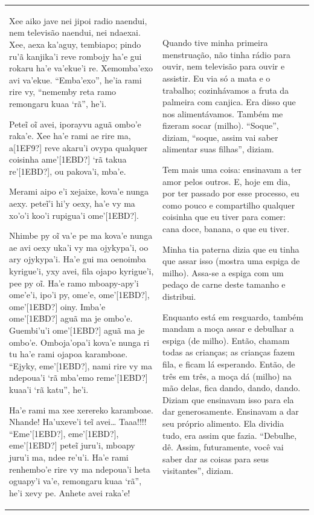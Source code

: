 \begin{flushleft}
\tablehead{}
\begin{supertabular}{m{2.8781598in}|m{2.8781598in}}
Xee aiko jave nei jipoi radio naendui, nem televisão naendui, nei
ndaexai. Xee, aexa ka’aguy, tembiapo; pindo ru’ã kanjika’i reve rombojy
ha’e gui rokaru ha’e va’ekue’i re. Xemomba’exo avi va’ekue. ``Emba’exo'',
he’ia rami rire vy, ``nememby reta ramo remongaru kuaa ‘rã'', he’i.  

Peteĩ oĩ avei, iporayvu aguã ombo’e raka’e.  Xee ha’e rami ae rire
ma, a[1EF9?] reve akaru’i  ovypa qualquer coisinha ame’[1EBD?] ‘rã
takua re’[1EBD?], ou pakova’i, mba’e. 

Merami aipo e’i xejaixe, kova’e nunga aexy. peteĩ’i hi’y oexy, ha’e
vy ma xo’o’i koo’i rupigua’i ome’[1EBD?]. 

Nhimbe py oĩ va’e pe ma kova’e nunga ae avi oexy uka’i vy ma
ojykypa’i, oo ary ojykypa’i. Ha’e gui ma oenoimba kyrigue’i, yxy avei,
fila ojapo kyrigue’i, pee py oĩ. Ha’e ramo mboapy-apy’i ome’e’i,
ipo’i py, ome’e, ome’[1EBD?], ome’[1EBD?] oiny. Imba’e ome’[1EBD?] aguã
ma je ombo’e. Guembi’u’i ome’[1EBD?] aguã ma je ombo’e.  Omboja’opa’i
kova’e nunga ri tu ha’e rami ojapoa karamboae. ``Ejyky, eme’[1EBD?],
nami rire vy ma ndepoua’i ‘rã mba’emo reme’[1EBD?] kuaa’i ‘rã katu'',
he’i. 

Ha’e rami ma xee xerereko karamboae. Nhande! Ha’uxeve’i teĩ avei\ldots{}
Taaa!!!! ``Eme’[1EBD?], eme’[1EBD?], eme’[1EBD?] peteĩ juru’i, mboapy
juru’i ma, ndee re’u’i. Ha’e rami renhembo’e rire vy ma ndepoua’i heta
oguapy’i va’e, remongaru kuaa ‘rã'', he’i xevy pe. Anhete avei raka’e! 
&
Quando tive minha primeira menstruação, não tinha rádio para ouvir, nem
televisão para ouvir e assistir. Eu via só a mata e o trabalho;
cozinhávamos a fruta da palmeira com canjica. Era disso que nos
alimentávamos. Também me fizeram socar (milho). ``Soque'', diziam,
``soque, assim vai saber alimentar suas filhas'', diziam. 

Tem mais uma coisa: ensinavam a ter amor pelos outros. E, hoje em dia,
por ter passado por esse processo, eu como pouco e compartilho qualquer
coisinha que eu tiver para comer: cana doce, banana, o que eu tiver. 

Minha tia paterna dizia que eu tinha que assar isso (mostra uma espiga
de milho). Assa-se a espiga com um pedaço de carne deste tamanho e
distribui.

Enquanto está em resguardo, também mandam a moça assar e debulhar a
espiga (de milho). Então, chamam todas as crianças; as crianças fazem
fila, e ficam lá esperando. Então, de três em três, a moça dá (milho)
na mão delas, fica dando, dando, dando. Diziam que ensinavam isso para
ela dar generosamente. Ensinavam a dar seu próprio alimento. Ela
dividia tudo, era assim que fazia. ``Debulhe, dê. Assim, futuramente,
você vai saber dar as coisas para seus visitantes'', diziam. 


\end{supertabular}
\end{flushleft}
